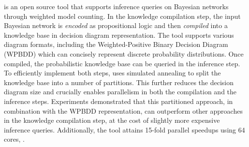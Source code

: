 
\toolname is an open source tool that supports inference queries on Bayesian networks through weighted model counting.
In the knowledge compilation step, the input Bayesian network is \emph{encoded} as propositional logic and then \emph{compiled} into a knowledge base in decision diagram representation. The tool supports various diagram formats, including the Weighted-Positive Binary Decision Diagram (WPBDD) which can concisely represent discrete probability distributions.
Once compiled, the probabilistic knowledge base can be queried in the inference step.
To efficiently implement both steps, \toolname uses simulated annealing to split the knowledge base into a number of partitions. This further reduces the decision diagram size and crucially enables parallelism in both the compilation and the inference steps.
Experiments demonstrated that this partitioned approach, in combination with the WPBDD representation, can outperform other approaches in the knowledge compilation step, at the cost of slightly more expensive inference queries.
Additionally, the tool attains 15-fold parallel speedups using 64 cores, .

